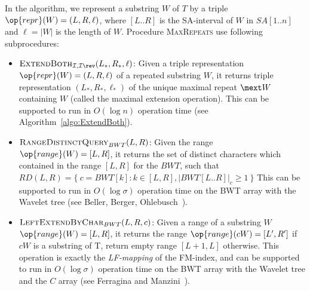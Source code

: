 In the algorithm, we represent a substring $W$ of $T$ by a triple $\op{repr}(W) = (L,R,\ell) $, where $[L .. R]$ is the SA-interval of $W$ in $SA[1..n]$ and $\ell = |W|$ is the length of $W$.
Procedure \textsc{MaxRepeats} use following subprocedures: 
\begin{itemize}
\item $\textsc{ExtendBoth}_{\mathcal{I},\mathcal{I}\rev}(L_*,R_*,\ell)$: Given a triple representation $\op{repr}(W) = (L,R,\ell)$ of a repeated substring $W$, it returns triple representation $(L_*,R_*,\ell_*)$ of the unique maximal repeat $\mext W$ containing $W$ (called the maximal extension operation). 
This can be supported to run in $O(\log n)$ operation time (see Algorithm~\ref{algo:ExtendBoth}). 

\item $\textsc{RangeDistinctQuery}_{BWT}(L,R)$: Given the range $\op{range}(W) = [L, R]$, it returns the set of distinct characters which contained in the range $[L,R]$ for the $BWT$, such that 
\begin{math}
RD(L, R) = \{\: c = BWT[k] : k \in [L, R], |BWT[L..R]|_c \ge 1 \:\}  
\end{math}
This can be supported to run in $O(\log\sigma)$ operation time on the BWT array with the Wavelet tree (see Beller, Berger, Ohlebusch~\cite{beller:berger2012space:efficient:bbo}). 



\item $\textsc{LeftExtendByChar}_{BWT}(L, R, c)$: Given a range of a substring $W$ $\op{range}(W) = [L, R]$, it returns the range $\op{range}(cW) = [L', R']$ if $cW$ is a substring of T, return empty range $[L+1, L]$ otherwise.
This operation is exactly the \textit{LF-mapping} of the FM-index, and can be supported to run in $O(\log\sigma)$ operation time on the BWT array with the Wavelet tree and the $C$ array (see Ferragina and Manzini~\cite{Ferragina05:FM}). 
\end{itemize}

